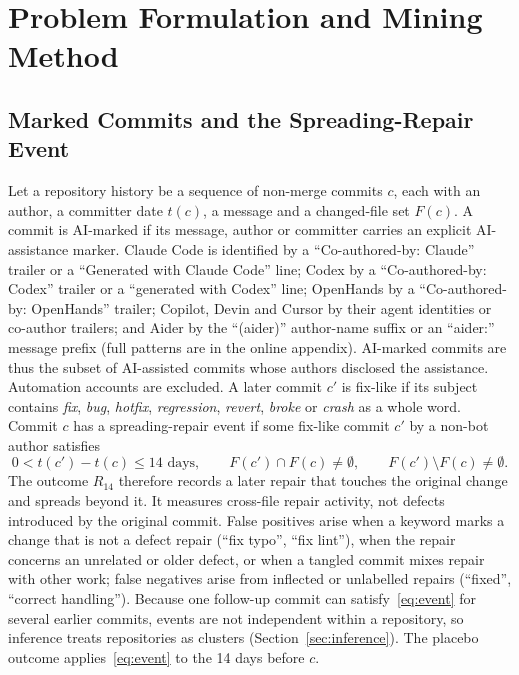 \documentclass[runningheads]{llncs}
\begin{document}
\section{Problem Formulation and Mining Method}

\subsection{Marked Commits and the Spreading-Repair Event}\label{sec:outcome}

Let a repository history be a sequence of non-merge commits $c$, each with an author, a committer date $t(c)$, a message and a changed-file set $F(c)$. A commit is AI-marked if its message, author or committer carries an explicit AI-assistance marker. Claude Code is identified by a ``Co-authored-by: Claude'' trailer or a ``Generated with Claude Code'' line; Codex by a ``Co-authored-by: Codex'' trailer or a ``generated with Codex'' line; OpenHands by a ``Co-authored-by: OpenHands'' trailer; Copilot, Devin and Cursor by their agent identities or co-author trailers; and Aider by the ``(aider)'' author-name suffix or an ``aider:'' message prefix (full patterns are in the online appendix). AI-marked commits are thus the subset of AI-assisted commits whose authors disclosed the assistance. Automation accounts are excluded. A later commit $c'$ is fix-like if its subject contains \emph{fix}, \emph{bug}, \emph{hotfix}, \emph{regression}, \emph{revert}, \emph{broke} or \emph{crash} as a whole word. Commit $c$ has a spreading-repair event if some fix-like commit $c'$ by a non-bot author satisfies
\begin{equation}\label{eq:event}
0 < t(c') - t(c) \le 14 \text{ days}, \qquad F(c') \cap F(c) \neq \emptyset, \qquad F(c') \setminus F(c) \neq \emptyset.
\end{equation}
The outcome $R_{14}$ therefore records a later repair that touches the original change and spreads beyond it. It measures cross-file repair activity, not defects introduced by the original commit. False positives arise when a keyword marks a change that is not a defect repair (``fix typo'', ``fix lint''), when the repair concerns an unrelated or older defect, or when a tangled commit mixes repair with other work; false negatives arise from inflected or unlabelled repairs (``fixed'', ``correct handling''). Because one follow-up commit can satisfy~\eqref{eq:event} for several earlier commits, events are not independent within a repository, so inference treats repositories as clusters (Section~\ref{sec:inference}). The placebo outcome applies~\eqref{eq:event} to the 14 days before $c$.
\end{document}
